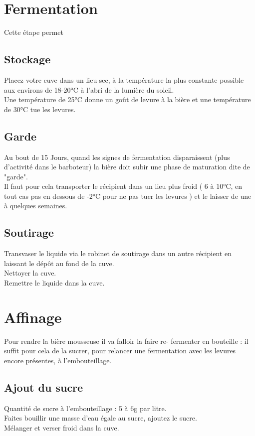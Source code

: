 \documentclass[twoside,twocolumn]{report}
\begin{document}
		\section{Fermentation}
		Cette étape permet 
		\subsection{Stockage}
		Placez votre cuve dans un lieu sec, à la température la
		plus constante possible aux environs de 18-20°C à l’abri de
		la lumière  du soleil.\\
		Une température de 25°C donne un goût de levure à la bière et une température de 30°C tue les levures.\\
		\subsection{Garde}
		Au bout de 15 Jours, quand les signes de fermentation disparaissent (plus d’activité dans le barboteur) la bière doit subir une phase de maturation dite de "garde".\\
		Il faut pour cela transporter le récipient dans un lieu plus froid ( 6 à 10°C, en tout cas pas en dessous de -2°C pour ne pas tuer les levures ) et le laisser de une à quelques semaines.
		\subsection{Soutirage}
		Transvaser le liquide via le robinet de soutirage dans un autre récipient en laissant le dépôt au fond de la cuve.\\
		Nettoyer la cuve.\\
		Remettre le liquide dans la cuve.\\
		
		\section{Affinage}
		Pour rendre la bière mousseuse il va falloir la faire re- fermenter en bouteille : il suffit pour cela	 de la sucrer, pour relancer une fermentation avec les levures encore présentes, à l’embouteillage.
		\subsection{Ajout du sucre}
		Quantité de sucre à l’embouteillage : 5 à 6g par litre.\\	 
		Faites bouillir une  masse d’eau égale au sucre, ajoutez le sucre. \\
		Mélanger et verser froid dans la cuve.\\
\end{document}
